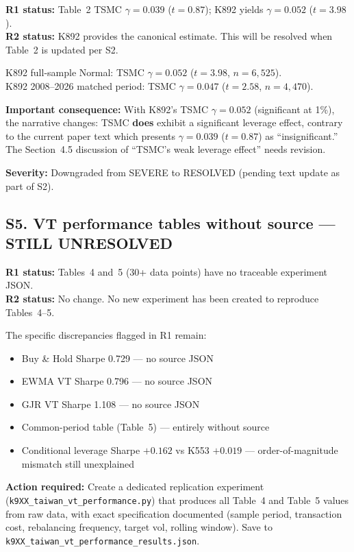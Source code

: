 \documentclass[12pt,a4paper]{article}
\begin{document}
\textbf{R1 status:} Table~2 TSMC $\gamma = 0.039$ ($t = 0.87$); K892 yields $\gamma = 0.052$ ($t = 3.98$).\\
\textbf{R2 status:} K892 provides the canonical estimate. This will be resolved when Table~2 is updated per S2.

K892 full-sample Normal: TSMC $\gamma = 0.052$ ($t = 3.98$, $n = 6{,}525$).\\
K892 2008--2026 matched period: TSMC $\gamma = 0.047$ ($t = 2.58$, $n = 4{,}470$).

\textbf{Important consequence:} With K892's TSMC $\gamma = 0.052$ (significant at 1\%), the narrative changes: TSMC \textbf{does} exhibit a significant leverage effect, contrary to the current paper text which presents $\gamma = 0.039$ ($t = 0.87$) as ``insignificant.'' The Section~4.5 discussion of ``TSMC's weak leverage effect'' needs revision.

\textbf{Severity:} \textcolor{okgreen}{Downgraded from SEVERE to RESOLVED} (pending text update as part of S2).

\bigskip

\subsection*{\textcolor{errorred}{S5. VT performance tables without source --- STILL UNRESOLVED}}

\textbf{R1 status:} Tables~4 and~5 (30+ data points) have no traceable experiment JSON.\\
\textbf{R2 status:} \textcolor{errorred}{No change.} No new experiment has been created to reproduce Tables~4--5.

The specific discrepancies flagged in R1 remain:
\begin{itemize}[nosep]
\item Buy \& Hold Sharpe 0.729 --- no source JSON
\item EWMA VT Sharpe 0.796 --- no source JSON
\item GJR VT Sharpe 1.108 --- no source JSON
\item Common-period table (Table~5) --- entirely without source
\item Conditional leverage Sharpe $+0.162$ vs K553 $+0.019$ --- order-of-magnitude mismatch still unexplained
\end{itemize}

\textbf{Action required:} Create a dedicated replication experiment (\texttt{k9XX\_taiwan\_vt\_performance.py}) that produces all Table~4 and Table~5 values from raw data, with exact specification documented (sample period, transaction cost, rebalancing frequency, target vol, rolling window). Save to \texttt{k9XX\_taiwan\_vt\_performance\_results.json}.
\end{document}
